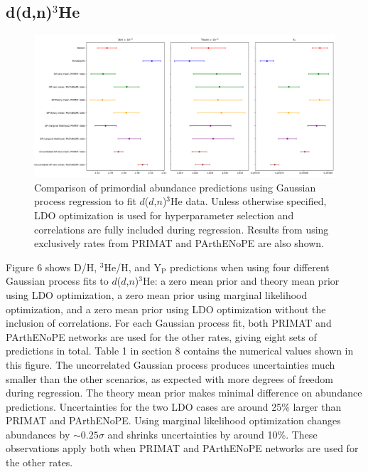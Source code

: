 \documentclass[%
 reprint,
superscriptaddress,
nofootinbib,
 amsmath,amssymb,
 aps,
 pra,
]{revtex4-2}
\begin{document}
\subsection{d(d,n)$^3$He}

\begin{figure}
	\centering
	\includegraphics[width=0.98\linewidth]{Figures/ddhe3n_comp.png}
	\caption{Comparison of primordial abundance predictions using Gaussian process regression to fit $d$($d$,$n$)$^3$He data. Unless otherwise specified, LDO optimization is used for hyperparameter selection and correlations are fully included during regression. Results from using exclusively rates from PRIMAT and PArthENoPE are also shown. }
\end{figure}

Figure 6 shows D/H, $^3$He/H, and Y$_\text{P}$ predictions when using four different Gaussian process fits to $d$($d$,$n$)$^3$He: a zero mean prior and theory mean prior using LDO optimization, a zero mean prior using marginal likelihood optimization, and a zero mean prior using LDO optimization without the inclusion of correlations. For each Gaussian process fit, both PRIMAT and PArthENoPE networks are used for the other rates, giving eight sets of predictions in total. Table 1 in section 8 contains the numerical values shown in this figure. The uncorrelated Gaussian process produces uncertainties much smaller than the other scenarios, as expected with more degrees of freedom during regression. The theory mean prior makes minimal difference on abundance predictions. Uncertainties for the two LDO cases are around 25\% larger than PRIMAT and PArthENoPE. Using marginal likelihood optimization changes abundances by $\sim0.25\sigma$ and shrinks uncertainties by around 10\%. These observations apply both when PRIMAT and PArthENoPE networks are used for the other rates. 
\end{document}
